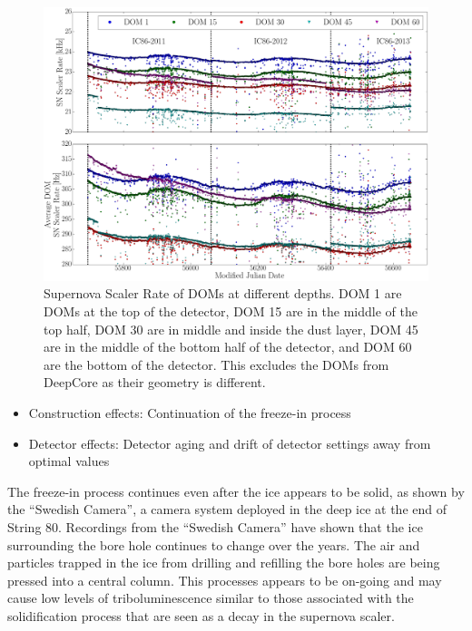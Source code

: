 \begin{figure}[h]
  \begin{center}
    \includegraphics[width=1\textwidth]{./figures/SNScalerRateLayersIC86I_III.png}
  \end{center}
  \caption{Supernova Scaler Rate of DOMs at different depths. DOM 1 are DOMs at the top of the detector, DOM 15 are in the middle of the top half, DOM 30 are in middle and inside the dust layer, DOM 45 are in the middle of the bottom half of the detector, and DOM 60 are the bottom of the detector. This excludes the DOMs from DeepCore as their geometry is different. \label{fig:scalerratedepth}}   
\end{figure}

\begin{itemize}
  \item Construction effects: Continuation of the freeze-in process
  \item Detector effects: Detector aging and drift of detector settings away from optimal values
\end{itemize}

The freeze-in process continues even after the ice appears to be solid, as shown by the ``Swedish Camera'', a camera system deployed in the deep ice at the end of String 80. Recordings from the ``Swedish Camera'' have shown that the ice surrounding the bore hole continues to change over the years. The air and particles trapped in the ice from drilling and refilling the bore holes are being pressed into a central column. This processes appears to be on-going and may cause low levels of triboluminescence similar to those associated with the solidification process that are seen as a decay in the supernova scaler. 

